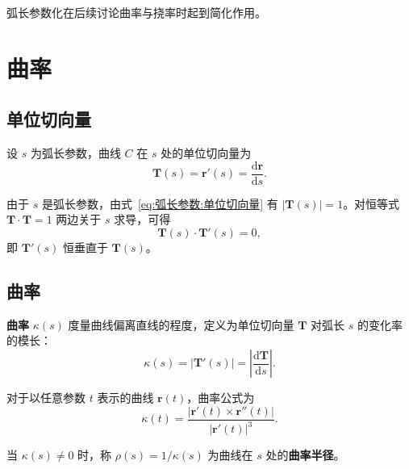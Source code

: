 弧长参数化在后续讨论曲率与挠率时起到简化作用。

\section{曲率}

\subsection{单位切向量}

设 $s$ 为弧长参数，曲线 $C$ 在 $s$ 处的单位切向量为
\begin{equation}
	\mathbf{T}(s)=\boldsymbol{r}'(s)=\frac{\mathrm{d}\boldsymbol{r}}{\mathrm{d}s}.
	\label{eq:单位切向量:定义}
\end{equation}

由于 $s$ 是弧长参数，由式~\eqref{eq:弧长参数:单位切向量} 有 $\left|\mathbf{T}(s)\right|=1$。对恒等式 $\mathbf{T}\cdot\mathbf{T}=1$ 两边关于 $s$ 求导，可得
\begin{equation}
	\mathbf{T}(s)\cdot\mathbf{T}'(s)=0,
	\label{eq:单位切向量:正交性}
\end{equation}
即 $\mathbf{T}'(s)$ 恒垂直于 $\mathbf{T}(s)$。

\subsection{曲率}

\begin{definition}[曲率]
	\textbf{曲率} $\kappa(s)$ 度量曲线偏离直线的程度，定义为单位切向量 $\mathbf{T}$ 对弧长 $s$ 的变化率的模长：
	\begin{equation}
		\kappa(s)=\left|\mathbf{T}'(s)\right|
		=\left|\frac{\mathrm{d}\mathbf{T}}{\mathrm{d}s}\right|.
		\label{eq:曲率:定义}
	\end{equation}
\end{definition}

\begin{proposition}[任意参数下的曲率公式]
	对于以任意参数 $t$ 表示的曲线 $\boldsymbol{r}(t)$，曲率公式为
	\begin{equation}
		\kappa(t)=\frac{\left|\boldsymbol{r}'(t)\times\boldsymbol{r}''(t)\right|}
		{\left|\boldsymbol{r}'(t)\right|^{3}}.
		\label{eq:曲率:任意参数公式}
	\end{equation}
\end{proposition}

\begin{definition}[曲率半径]
	当 $\kappa(s)\neq0$ 时，称 $\rho(s)=1/\kappa(s)$ 为曲线在 $s$ 处的\textbf{曲率半径}。
\end{definition}

